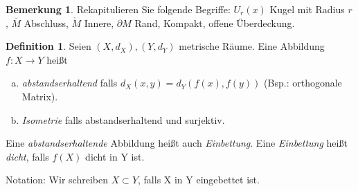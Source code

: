 \documentclass[ngerman]{report}
\theoremstyle{plain}%
\theoremstyle{definition}%
\newtheorem{definition}[thm]{Definition}
\theoremstyle{myStyle}
\newtheorem{bem}[thm]{Bemerkung}
\begin{document}
\begin{bem}Rekapitulieren Sie folgende Begriffe:
$U_r(x)$ Kugel mit Radius $r$,	$\overline{M}$ Abschluss,	$\mathring{M}$ Innere,	$\partial M$ Rand,	Kompakt,	offene Überdeckung.
\end{bem}

\begin{definition} %
Seien $(X,d_X),(Y,d_Y)$ metrische Räume. Eine Abbildung $f:X\to Y$ heißt
\begin{enumerate}[(a)]
\item \textit{abstandserhaltend} falls $d_X(x,y)=d_Y(f(x),f(y))$ (Bsp.: orthogonale Matrix).
\item \textit{Isometrie} falls abstandserhaltend und surjektiv.
\end{enumerate}
Eine \textit{abstandserhaltende}  Abbildung heißt auch \textit{Einbettung}. Eine \textit{Einbettung} heißt \textit{dicht}, falls $f(X)$ dicht in Y ist.\par
Notation: Wir schreiben $X\subset Y$, falls X in Y eingebettet ist.
\end{definition}
\end{document}
